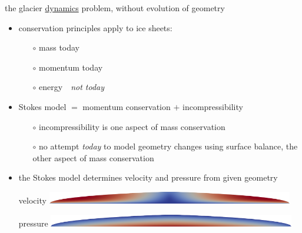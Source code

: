 \documentclass[10pt,
               hyperref={colorlinks,citecolor=DeepPink4,linkcolor=black,urlcolor=blue},
               svgnames]{beamer}
\newcommand{\cmark}{\ding{51}}
\newcommand{\xmark}{\ding{55}}
\begin{document}
\begin{frame}{the glacier \underline{dynamics} problem, without evolution of geometry}

\begin{itemize}
\item conservation principles apply to ice sheets:
    \begin{itemize}
    \item[$\circ$] mass \hfill \cmark\qquad today
    \item[$\circ$] momentum \hfill \cmark\qquad today
    \item[$\circ$] energy \hfill \xmark\,\, \emph{not today}
    \end{itemize}
\item Stokes model $=$ momentum conservation $+$ incompressibility
    \begin{itemize}
    \item[$\circ$] incompressibility is one aspect of mass conservation
    \item[$\circ$] no attempt \emph{today} to model geometry changes using surface balance, the other aspect of mass conservation
    \end{itemize}
\item \alert{the Stokes model determines velocity and pressure from given geometry}

\bigskip
{\scriptsize velocity} \hfill \includegraphics[width=0.85\textwidth]{figs/speed.png}

\bigskip
{\scriptsize pressure} \hfill \includegraphics[width=0.85\textwidth]{figs/pressure.png}

\bigskip
\end{itemize}
\end{frame}
\end{document}
